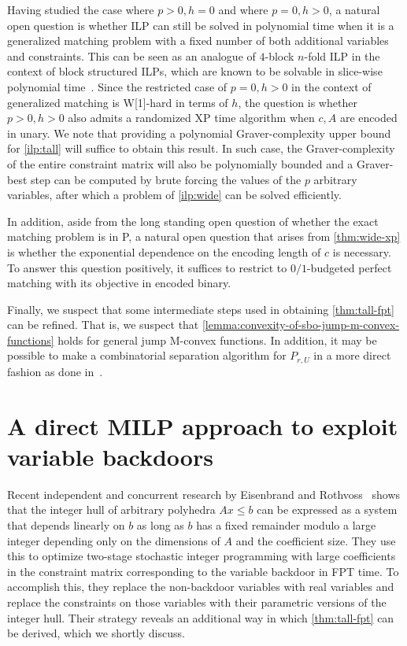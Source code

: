 \documentclass[a4paper,UKenglish,cleveref,thm-restate]{lipics-v2021}
\begin{document}
Having studied the case where $p>0,h=0$ and where $p=0,h>0$, a natural open question is whether ILP can still be solved in polynomial time when it is a generalized matching problem with a fixed number of both additional variables and constraints. This can be seen as an analogue of $4$-block $n$-fold ILP in the context of block structured ILPs, which are known to be solvable in slice-wise polynomial time~\cite{DBLP:conf/ipco/HemmeckeKW10}. Since the restricted case of $p=0,h>0$ in the context of generalized matching is W[1]-hard in terms of $h$, the question is whether $p>0,h>0$ also admits a randomized XP time algorithm when $c,A$ are encoded in unary. We note that providing a polynomial Graver-complexity upper bound for \cref{ilp:tall} will suffice to obtain this result. In such case, the Graver-complexity of the entire constraint matrix will also be polynomially bounded and a Graver-best step can be computed by brute forcing the values of the $p$ arbitrary variables, after which a problem of \cref{ilp:wide} can be solved efficiently.

In addition, aside from the long standing open question of whether the exact matching problem is in P, a natural open question that arises from \cref{thm:wide-xp} is whether the exponential dependence on the encoding length of $c$ is necessary. To answer this question positively, it suffices to restrict to $0/1$-budgeted perfect matching with its objective in encoded binary\iftoggle{ea}{, see \cref{sec:wide}}{}.

Finally, we suspect that some intermediate steps used in obtaining \cref{thm:tall-fpt} can be refined. That is, we suspect that \cref{lemma:convexity-of-sbo-jump-m-convex-functions} holds for general jump M-convex functions. In addition, it may be possible to make a combinatorial separation algorithm for $P_{r,U}$ in a more direct fashion as done in~\cite{DBLP:journals/mor/Zhang03}. 


\appendix

\section{A direct MILP approach to exploit variable backdoors}
\label{sec:milp-approach-for-tall-fpt}

Recent independent and concurrent research by Eisenbrand and Rothvoss~\cite{eisenbrand2025parameterizedlinearformulationinteger} shows that the integer hull of arbitrary polyhedra $Ax\le b$ can be expressed as a system that depends linearly on $b$ as long as $b$ has a fixed remainder modulo a large integer depending only on the dimensions of $A$ and the coefficient size. They use this to optimize two-stage stochastic integer programming with large coefficients in the constraint matrix corresponding to the variable backdoor in FPT time. To accomplish this, they replace the non-backdoor variables with real variables and replace the constraints on those variables with their parametric versions of the integer hull. Their strategy reveals an additional way in which \cref{thm:tall-fpt} can be derived, which we shortly discuss.
\end{document}
